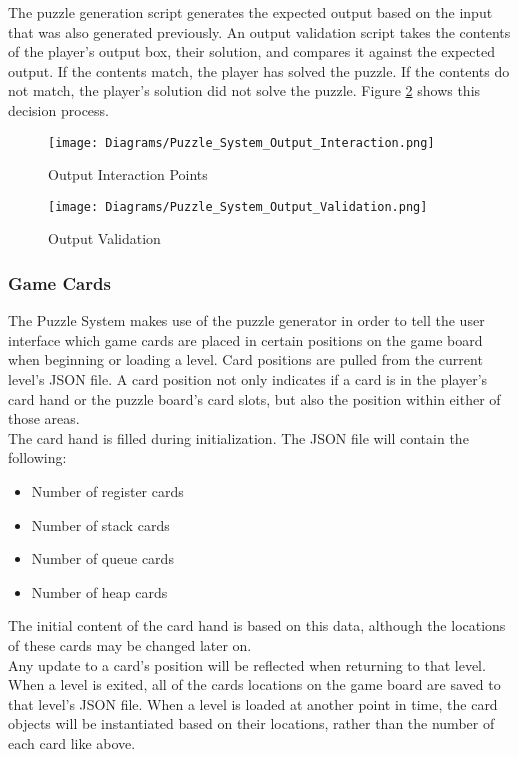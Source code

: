 The puzzle generation script generates the expected output based on the input that
was also generated previously. An output validation script takes the contents of
the player's output box, their solution, and compares it against the expected output.
If the contents match, the player has solved the puzzle. If the contents do not match,
the player's solution did not solve the puzzle. Figure \ref{fig:Puzzle_System_Output_Validation} shows this decision process.

\begin{figure}[!hb]
  \caption{Output Interaction Points}
  \label{fig:Puzzle_System_Output_Interaction}
  \centering
  \texttt{[image: Diagrams/Puzzle\_System\_Output\_Interaction.png]}
\end{figure}

\begin{figure}[!hb]
  \caption{Output Validation}
  \label{fig:Puzzle_System_Output_Validation}
  \centering
  \texttt{[image: Diagrams/Puzzle\_System\_Output\_Validation.png]}
\end{figure}
\vfill
\clearpage

\subsubsection{Game Cards}
The Puzzle System makes use of the puzzle generator in order to tell the user interface
which game cards are placed in certain positions on the game board when beginning
or loading a level. Card positions are pulled from the current level's JSON file.
A card position not only indicates if a card is in the player's card hand or the puzzle board's
card slots, but also the position within either of those areas.\\

The card hand is filled during initialization. The JSON file will contain the following:
\begin{itemize}
   \item Number of register cards
   \item Number of stack cards
   \item Number of queue cards
   \item Number of heap cards
\end{itemize}

The initial content of the card hand is based on this data, although the locations
of these cards may be changed later on.\\

Any update to a card's position will be reflected when returning to that level.
When a level is exited, all of the cards locations on the game board are saved to
that level's JSON file. When a level is loaded at another point in time, the card
objects will be instantiated based on their locations, rather than the number of
each card like above.\\

